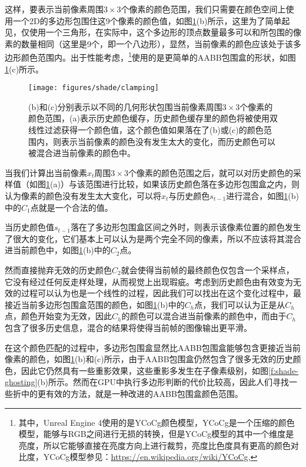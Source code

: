 这样，要表示当前像素周围$3\times 3$个像素的颜色范围，我们只需要在颜色空间上使用一个2D的多边形包围住这9个像素的颜色值，如图\ref{f:shade-clamping}(b)所示，这里为了简单起见，仅使用一个三角形，在实际中，这个多边形的顶点数量最多可以和所包围的像素的数量相同（这里是9个，即一个八边形），显然，当前像素的颜色应该处于该多边形颜色范围内。出于性能考虑，\cite{a:AnExcursioninTemporalSupersampling,a:RealtimeglobalilluminationandreflectionsinDust514,a:TemporalAntialiasingInUncharted4}\footnote{其中，Unreal Engine 4使用的是YCoCg颜色模型，YCoCg是一个压缩的颜色模型，能够与RGB之间进行无损的转换，但是YCoCg模型的其中一个维度是亮度，所以它能够直接在亮度方向上进行裁剪，亮度比色度具有更高的颜色对比度，YCoCg模型参见：\url{https://en.wikipedia.org/wiki/YCoCg},}使用的是更简单的AABB包围盒的形状，如图\ref{f:shade-clamping}(c)所示。

\begin{figure}
\begin{fullwidth}
	\texttt{[image: figures/shade/clamping]}
	\caption{(b)和(c)分别表示以不同的几何形状包围当前像素周围$3\times 3$个像素的颜色范围，(a)表示历史颜色缓存，历史颜色缓存里的颜色将被使用双线性过滤获得一个颜色值，这个颜色值如果落在了(b)或(c)的颜色范围内，则表示当前像素的颜色没有发生太大的变化，而历史颜色可以被混合进当前像素的颜色中。}
	\label{f:shade-clamping} %
\end{fullwidth}
\end{figure}

当我们计算出当前像素$x_t$周围$3\times 3$个像素的颜色范围之后，就可以对历史颜色的采样值（如图\ref{f:shade-clamping}(a)）与该范围进行比较，如果该历史颜色落在多边形包围盒之内，则认为像素的颜色没有发生太大变化，可以将$x_t$与历史颜色$s_{t-1}$进行混合，如图\ref{f:shade-clamping}(b)中的$C_1$点就是一个合法的值。

当历史颜色值$s_{t-1}$落在了多边形包围盒区间之外时，则表示该像素位置的颜色发生了很大的变化，它们基本上可以认为是两个完全不同的像素，所以不应该将其混合进当前颜色中，如图\ref{f:shade-clamping}(b)中的$C_2$点。

然而直接抛弃无效的历史颜色$C_2$就会使得当前帧的最终颜色仅包含一个采样点，它没有经过任何反走样处理，从而视觉上出现瑕疵。考虑到历史颜色由有效变为无效的过程可以认为也是一个线性的过程，因此我们可以找出在这个变化过程中，最接近当前多边形包围盒范围的颜色，如图\ref{f:shade-clamping}(b)中的$C_h$点，我们可以认为正是从$C_h$点，颜色开始变为无效，因此$C_h$的颜色可以混合进当前像素的颜色中，而由于$C_h$包含了很多历史信息，混合的结果将使得当前帧的图像输出更平滑。

在这个颜色匹配的过程中，多边形包围盒显然比AABB包围盒能够包含更接近当前像素的颜色，如图\ref{f:shade-clamping}(b)和(c)所示，由于AABB包围盒仍然包含了很多无效的历史颜色，因此它仍然具有一些重影效果，这些重影多发生在子像素级别，如图\ref{f:shade-ghosting}(b)所示。然而在GPU中执行多边形判断的代价比较高，因此人们寻找一些折中的更有效的方法，\cite{a:AnExcursioninTemporalSupersampling}就是一种改进的AABB包围盒颜色范围。


